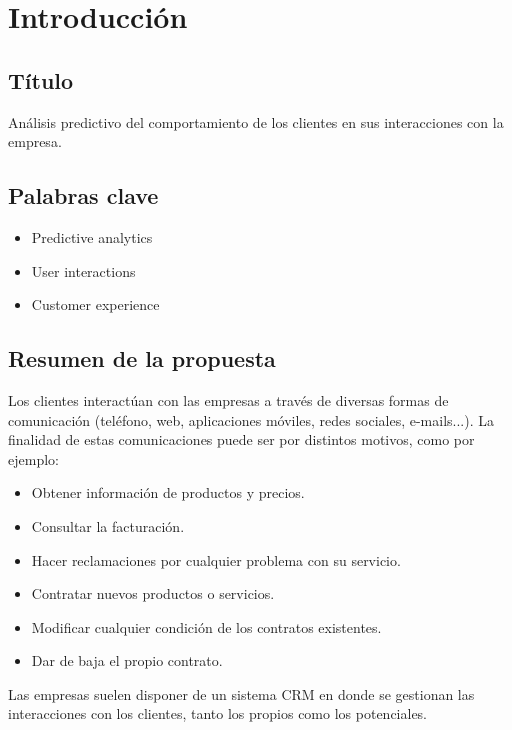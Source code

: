 \chapter{Introducción}
\label{chapter:introduccion}

\section{Título}

Análisis predictivo del comportamiento de los clientes en sus interacciones con la empresa.
 
 
\section{Palabras clave}

\begin{itemize}
    \item Predictive analytics  
    \item User interactions 
    \item Customer experience 
\end{itemize}

\section{Resumen de la propuesta}

Los clientes interactúan con las empresas a través de diversas formas de comunicación (teléfono, web, aplicaciones móviles, redes sociales, e-mails...). La finalidad de estas comunicaciones puede ser por distintos motivos, como por ejemplo: 

\begin{itemize}
  \item Obtener información de productos y precios.
  \item Consultar la facturación.
  \item Hacer reclamaciones por cualquier problema con su servicio.
  \item Contratar nuevos productos o servicios.
  \item Modificar cualquier condición de los contratos existentes.
  \item Dar de baja el propio contrato.
\end{itemize}

Las empresas suelen disponer de un sistema CRM en donde se gestionan las interacciones con los clientes, tanto los propios como los potenciales. 

